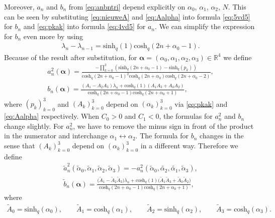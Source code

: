 \documentclass[pdftex]{sigma}
\numberwithin{equation}{section}
\newcommand{\RR}{\mathbb{R}}
\newcommand{\chq}{\mathrm{cosh}_q}
\newcommand{\shq}{\mathrm{sinh}_q}
\begin{document}
Moreover, $a_n$ and $b_n$ from \eqref{eq:anbntri} depend explicitly on $\alpha_0$, $\alpha_1$, $\alpha_2$, $N$. This can be seen by substituting \eqref{eq:nieuweA} and \eqref{eq:Aalpha} into formula \eqref{eq:5vd5} for $b_n$ and \eqref{eq:pkak} into formula \eqref{eq:4vd5} for $a_n$. We can simplify the expression for $b_n$ even more by using
\begin{gather}
	\lambda_n-\lambda_{n-1}=\shq(1)\chq(2n+\alpha_0-1).\label{eq:difference eigenvalues}
\end{gather}
Because of the result after substitution, for $\bm{\alpha}=(\alpha_0,\alpha_1,\alpha_2,\alpha_3)\in\RR^4$ we define
\begin{gather}
a_n^2(\bm{\alpha})=\frac{-\prod_{k=0}^3(\shq(2n+\alpha_0-1)-\shq(p_k))}{\chq(2n+\alpha_0-1)^2\chq(2n+\alpha_0)\chq(2n+\alpha_0-2)},\label{eq:annew}\\
b_n(\bm{\alpha})=\frac{ (A_1 -A_2A_3)\lambda_n+\chq(1) (A_1A_3+A_0A_2)}{\chq(2n+\alpha_0-1)\chq(2n+\alpha_0+1)},\label{eq:bnnew}
\end{gather}
where $(p_k)_{k=0}^3$ and $(A_k)_{k=0}^3$ depend on $(\alpha_k)_{k=0}^3$ via \eqref{eq:pkak} and \eqref{eq:Aalpha} respectively. When $C_0>0$ and $C_1<0$, the formulas for $a_n^2$ and $b_n$ change slightly. For $a_n^2$, we have to remove the minus sign in front of the product in the numerator and interchange $\alpha_1\leftrightarrow \alpha_2$. The formula for $b_n$ changes in the sense that $(A_k)_{k=0}^3$ depend on $(\alpha_k)_{k=0}^3$ in a different way. Therefore we define
\begin{gather}
	\tilde{a}_n^2(\tilde{\alpha}_0,\tilde{\alpha}_1,\tilde{\alpha}_2,\tilde{\alpha}_3) =-a_n^2(\tilde{\alpha}_0,\tilde{\alpha_2},\tilde{\alpha_1},\tilde{\alpha}_3),\label{eq:annewtilde}\\
	\tilde{b}_n(\bm{\alpha})=\frac{ \big(\tilde{A}_1 -\tilde{A}_2\tilde{A}_3\big)\lambda_n+\chq(1) \big(\tilde{A}_1\tilde{A}_3+\tilde{A}_0\tilde{A}_2\big)}{\chq(2n+\alpha_0-1)\chq(2n+\alpha_0+1)},\label{eq:bnnewtilde}
\end{gather}
where
\begin{gather*}
	\tilde{A}_0=\shq(\alpha_0),\qquad \tilde{A}_1=\chq(\alpha_1),\qquad \tilde{A}_2=\shq(\alpha_2),\qquad \tilde{A}_3=\chq(\alpha_3).\label{eq:Aalphatilde}
\end{gather*}
\end{document}
